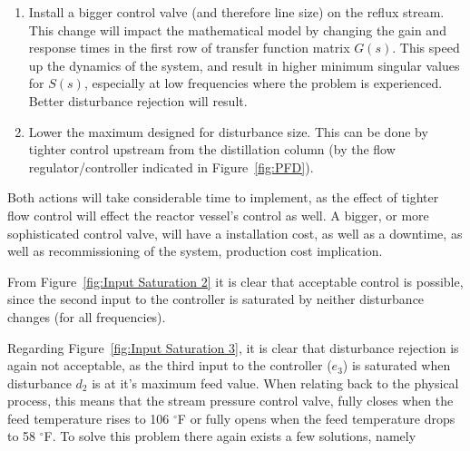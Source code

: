 \begin{enumerate}
	\item Install a bigger control valve (and therefore line size) on the reflux stream. This change will impact the mathematical model by changing the gain and response times in the first row of transfer function matrix $G(s)$. This speed up the dynamics of the system, and result in higher minimum singular values for $S(s)$, especially at low frequencies where the problem is experienced. Better disturbance rejection will result.
	
	\item Lower the maximum designed for disturbance size. This can be done by tighter control upstream from the distillation column (by the flow regulator/controller indicated in Figure~\ref{fig:PFD}).
	
\end{enumerate}   

Both actions will take considerable time to implement, as the effect of tighter flow control will effect the reactor vessel's control as well. A bigger, or more sophisticated control valve, will have a installation cost, as well as a downtime, as well as recommissioning of the system, production cost implication. 

From Figure~\ref{fig:Input Saturation 2} it is clear that acceptable control is possible, since the second input to the controller is saturated by neither disturbance changes (for all frequencies).

Regarding Figure~\ref{fig:Input Saturation 3}, it is clear that disturbance rejection is again not acceptable, as the third input to the controller ($e_3$) is saturated when disturbance $d_2$ is at it's maximum feed value. When relating back to the physical process, this means that the stream pressure control valve, fully closes when the feed temperature rises to 106 $^{\circ}$F or fully opens when the feed temperature drops to 58 $^{\circ}$F. To solve this problem there again exists a few solutions, namely

